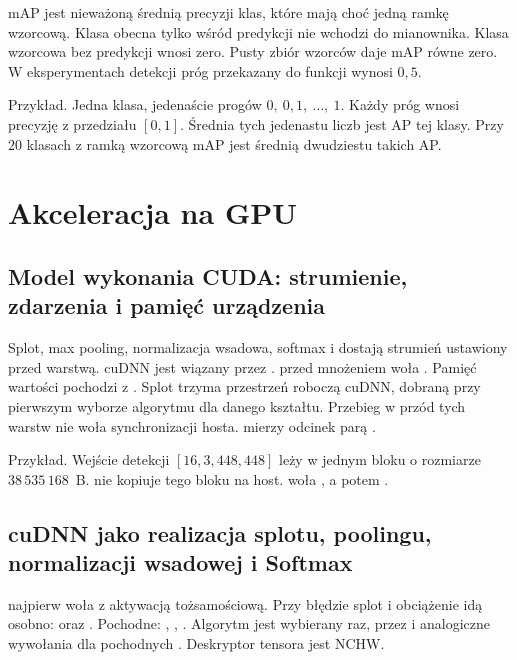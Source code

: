mAP jest nieważoną średnią precyzji klas, które mają choć jedną ramkę wzorcową. Klasa obecna tylko wśród predykcji nie wchodzi do mianownika. Klasa wzorcowa bez predykcji wnosi zero. Pusty zbiór wzorców daje mAP równe zero. W eksperymentach detekcji próg przekazany do funkcji wynosi \(0{,}5\).

Przykład. Jedna klasa, jedenaście progów \(0,\ 0{,}1,\ \ldots,\ 1\). Każdy próg wnosi precyzję z przedziału \([0, 1]\). Średnia tych jedenastu liczb jest AP tej klasy. Przy \(20\) klasach z ramką wzorcową mAP jest średnią dwudziestu takich AP.

\section{Akceleracja na GPU}

\subsection{Model wykonania CUDA: strumienie, zdarzenia i pamięć urządzenia}

Splot, max pooling, normalizacja wsadowa, softmax i  dostają strumień ustawiony przed warstwą. cuDNN jest wiązany przez .  przed mnożeniem woła  \cite{nvidia-cuda}. Pamięć wartości pochodzi z . Splot trzyma przestrzeń roboczą cuDNN, dobraną przy pierwszym wyborze algorytmu dla danego kształtu. Przebieg w przód tych warstw nie woła synchronizacji hosta.  mierzy odcinek parą .

Przykład. Wejście detekcji \([16, 3, 448, 448]\) leży w jednym bloku  o rozmiarze \(38\,535\,168\)~B.  nie kopiuje tego bloku na host.  woła , a potem .

\subsection{cuDNN jako realizacja splotu, poolingu, normalizacji wsadowej i Softmax}

 najpierw woła  z aktywacją tożsamościową. Przy błędzie splot i obciążenie idą osobno:  oraz . Pochodne: , , . Algorytm jest wybierany raz, przez  i analogiczne wywołania dla pochodnych \cite{chetlur2014cudnn,nvidia-cudnn}. Deskryptor tensora jest NCHW.

